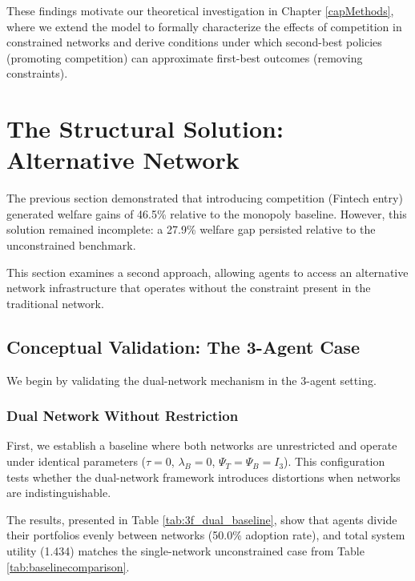 These findings motivate our theoretical investigation in Chapter \ref{capMethods}, where we extend the  model to formally characterize the effects of competition in constrained networks and derive conditions under which second-best policies (promoting competition) can approximate first-best outcomes (removing constraints).

\section{The Structural Solution: Alternative Network}
\label{sec:structural_solution}

The previous section demonstrated that introducing competition (Fintech entry) generated welfare gains of 46.5\% relative to the monopoly baseline. However, this solution remained incomplete: a 27.9\% welfare gap persisted relative to the unconstrained benchmark.

This section examines a second approach, allowing agents to access an alternative network infrastructure that operates without the constraint present in the traditional network.

\subsection{Conceptual Validation: The 3-Agent Case}
\label{sec:dual_3agents}

We begin by validating the dual-network mechanism in the 3-agent setting.

\subsubsection{Dual Network Without Restriction}

First, we establish a baseline where both networks are unrestricted and operate under identical parameters ($\tau=0$, $\lambda_B=0$, $\Psi_T=\Psi_B=I_3$). This configuration tests whether the dual-network framework introduces distortions when networks are indistinguishable.

The results, presented in Table \ref{tab:3f_dual_baseline}, show that agents divide their portfolios evenly between networks (50.0\% adoption rate), and total system utility (1.434) matches the single-network unconstrained case from Table \ref{tab:baselinecomparison}.

